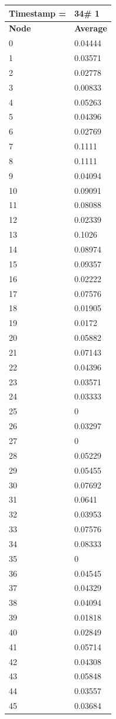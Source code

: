 \begin{tabular}{|l||l|}
\hline
\textbf{Timestamp =} & \textbf{34}\# 1\\\hline
	\textbf{Node} & \textbf{Average} \\ \hline
\hline
	0 & 0.04444 \\ \hline
	1 & 0.03571 \\ \hline
	2 & 0.02778 \\ \hline
	3 & 0.00833 \\ \hline
	4 & 0.05263 \\ \hline
	5 & 0.04396 \\ \hline
	6 & 0.02769 \\ \hline
	7 & 0.1111 \\ \hline
	8 & 0.1111 \\ \hline
	9 & 0.04094 \\ \hline
	10 & 0.09091 \\ \hline
	11 & 0.08088 \\ \hline
	12 & 0.02339 \\ \hline
	13 & 0.1026 \\ \hline
	14 & 0.08974 \\ \hline
	15 & 0.09357 \\ \hline
	16 & 0.02222 \\ \hline
	17 & 0.07576 \\ \hline
	18 & 0.01905 \\ \hline
	19 & 0.0172 \\ \hline
	20 & 0.05882 \\ \hline
	21 & 0.07143 \\ \hline
	22 & 0.04396 \\ \hline
	23 & 0.03571 \\ \hline
	24 & 0.03333 \\ \hline
	25 & 0 \\ \hline
	26 & 0.03297 \\ \hline
	27 & 0 \\ \hline
	28 & 0.05229 \\ \hline
	29 & 0.05455 \\ \hline
	30 & 0.07692 \\ \hline
	31 & 0.0641 \\ \hline
	32 & 0.03953 \\ \hline
	33 & 0.07576 \\ \hline
	34 & 0.08333 \\ \hline
	35 & 0 \\ \hline
	36 & 0.04545 \\ \hline
	37 & 0.04329 \\ \hline
	38 & 0.04094 \\ \hline
	39 & 0.01818 \\ \hline
	40 & 0.02849 \\ \hline
	41 & 0.05714 \\ \hline
	42 & 0.04308 \\ \hline
	43 & 0.05848 \\ \hline
	44 & 0.03557 \\ \hline
	45 & 0.03684 \\ \hline
\end{tabular}
